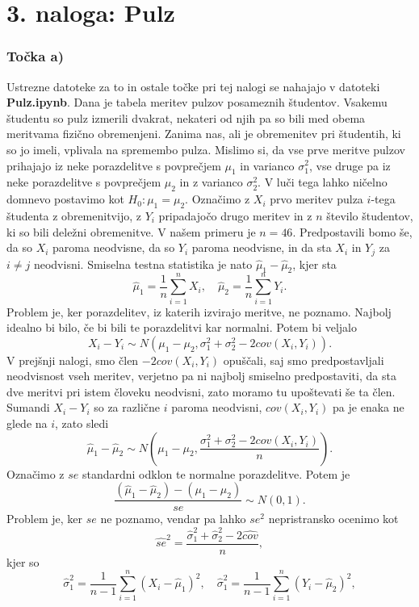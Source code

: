 \documentclass[12pt, letterpaper]{article}
\begin{document}
\section*{3. naloga: Pulz}

\subsubsection*{Točka a)} Ustrezne datoteke za to in ostale točke pri tej nalogi se nahajajo v datoteki \textbf{Pulz.ipynb}. Dana je tabela meritev pulzov posameznih študentov. Vsakemu študentu so pulz izmerili dvakrat, nekateri od njih pa so bili med obema meritvama fizično obremenjeni. Zanima nas, ali je obremenitev pri študentih, ki so jo imeli, vplivala na spremembo pulza. Mislimo si, da vse prve meritve pulzov prihajajo iz neke porazdelitve s povprečjem $\mu_1$ in varianco $\sigma_1^2$, vse druge pa iz neke porazdelitve s povprečjem $\mu_2$ in z varianco $\sigma_2^2$. V luči tega lahko ničelno domnevo postavimo kot $H_0 : \mu_1 = \mu_2$. Označimo z $X_i$ prvo meritev pulza $i$-tega študenta z obremenitvijo, z $Y_i$ pripadajočo drugo meritev in z $n$ število študentov, ki so bili deležni obremenitve. V našem primeru je $n = 46$. Predpostavili bomo še, da so $X_i$ paroma neodvisne, da so $Y_i$ paroma neodvisne, in da sta $X_i$ in $Y_j$ za $i \neq j$ neodvisni. Smiselna testna statistika je nato $\hat{\mu}_1 - \hat{\mu}_2$, kjer sta
\[
\hat{\mu}_1 = \frac{1}{n}\sum_{i=1}^nX_i, \quad
\hat{\mu}_2 = \frac{1}{n}\sum_{i=1}^nY_i.
\]
Problem je, ker porazdelitev, iz katerih izvirajo meritve, ne poznamo. Najbolj idealno bi bilo, če bi bili te porazdelitvi kar normalni. Potem bi veljalo
\[
X_i - Y_i \sim N(\mu_1 - \mu_2, \sigma_1^2 + \sigma_2^2 - 2cov(X_i,Y_i)).
\]
V prejšnji nalogi, smo člen $-2cov(X_i,Y_i)$ opuščali, saj smo predpostavljali neodvisnost vseh meritev, verjetno pa ni najbolj smiselno predpostaviti, da sta dve meritvi pri istem človeku neodvisni, zato moramo tu upoštevati še ta člen. Sumandi $X_i - Y_i$ so za različne $i$ paroma neodvisni, $cov(X_i,Y_i)$ pa je enaka ne glede na $i$, zato sledi
\[
\hat{\mu}_1 - \hat{\mu}_2 \sim N\left(\mu_1 - \mu_2, \frac{\sigma_1^2 + \sigma_2^2 - 2cov(X_i,Y_i)}{n}\right).
\]
Označimo z $se$ standardni odklon te normalne porazdelitve. Potem je
\[
\frac{(\hat{\mu}_1 - \hat{\mu}_2) - (\mu_1 - \mu_2)}{se} \sim N(0,1).
\]
Problem je, ker $se$ ne poznamo, vendar pa lahko $se^2$ nepristransko ocenimo kot
\[
\hat{se}^2 = \frac{\hat{\sigma}_1^2 + \hat{\sigma}_2^2 - 2\widehat{cov}}{n},
\]
kjer so
\[
\hat{\sigma}_1^2 = \frac{1}{n-1}\sum_{i=1}^n(X_i - \hat{\mu}_1)^2, \quad
\hat{\sigma}_1^2 = \frac{1}{n-1}\sum_{i=1}^n(Y_i - \hat{\mu}_2)^2,
\]
\end{document}
